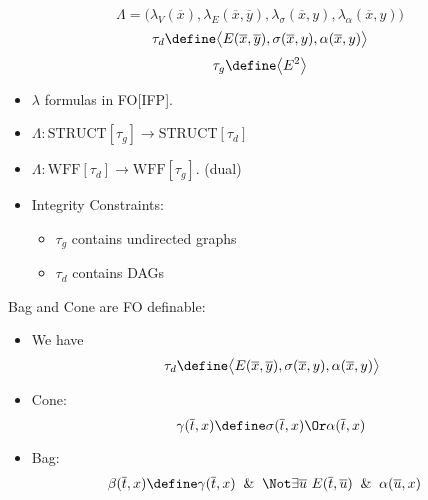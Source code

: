 \documentclass{beamer}
\begin{document}
\begin{frame}
  \begin{equation*}
    \Lambda = \bigl(\lambda_V(\overline{x}), \lambda_E(\overline{x},
    \overline{y}), \lambda_\sigma(\overline{x}, y),
    \lambda_\alpha(\overline{x}, y)\bigr)
  \end{equation*}
  \begin{equation*}
    \tau_{d} \define \bigl\langle E(\overline{x}, \overline{y}),
      \sigma(\overline{x}, y), \alpha(\overline{x}, y) \bigr\rangle
  \end{equation*}
  \begin{equation*}
    \tau_{g} \define \bigl\langle E^2 \bigr\rangle
  \end{equation*}
  \begin{itemize}
  \item $\lambda$ formulas in FO[IFP].
    \pause
  \item $\Lambda : \text{STRUCT}[\tau_g] \to \text{STRUCT}[\tau_d]$
    \pause
  \item $\Lambda : \text{WFF}[\tau_d] \to \text{WFF}[\tau_g]$. (dual)
    \pause
  \item   Integrity Constraints:
    \begin{itemize}
    \item $\tau_g$ contains undirected graphs
    \item $\tau_d$ contains DAGs
    \end{itemize}
  \end{itemize}
\end{frame}

\begin{frame}
  Bag and Cone are FO definable:
  \begin{itemize}
  \item We have
    \begin{equation*}
      \tau_{d} \define \bigl\langle E(\overline{x}, \overline{y}),
      \sigma(\overline{x}, y), \alpha(\overline{x}, y) \bigr\rangle
    \end{equation*}
  \item Cone:
    \begin{equation*}
      \gamma(\overline{t}, x) \define \sigma(\overline{t}, x) \Or
      \alpha(\overline{t}, x)
    \end{equation*}
  \item Bag:
    \begin{align*}
      \beta(\overline{t}, x) &\define \gamma(\overline{t}, x) \And \Not
      \exists \overline{u}\ E(\overline{t}, \overline{u}) \And
      \alpha(\overline{u}, x)
    \end{align*}
  \end{itemize}
\end{frame}
\end{document}
